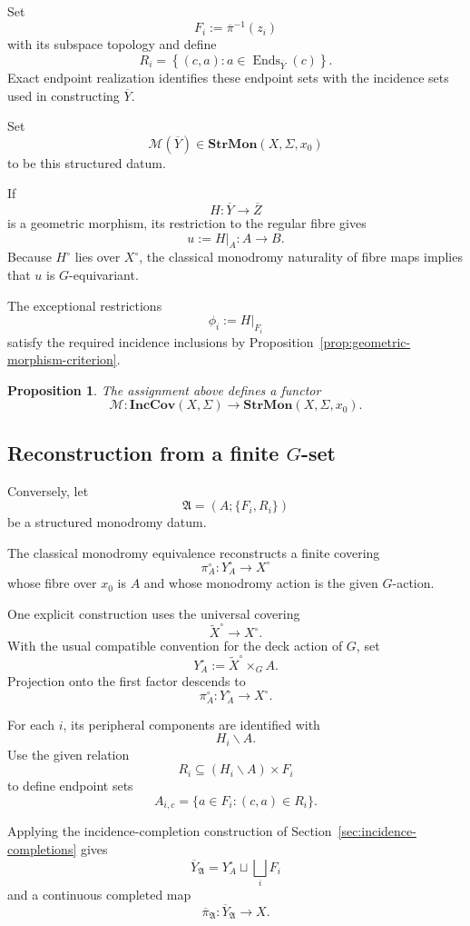 \documentclass[11pt]{article}
\theoremstyle{plain}
\newtheorem{proposition}[theorem]{Proposition}
\theoremstyle{definition}
\begin{document}
Set
\[
F_i:=\overline\pi^{-1}(z_i)
\]
with its subspace topology and define
\[
R_i
=
\left\{
(c,a):
a\in
\operatorname{Ends}_{\overline Y}(c)
\right\}.
\]
Exact endpoint realization identifies these endpoint sets with the
incidence sets used in constructing $\overline Y$.

Set
\[
\mathscr M(\overline Y)
\in
\mathbf{StrMon}(X,\Sigma,x_0)
\]
to be this structured datum.

If
\[
H:\overline Y\to\overline Z
\]
is a geometric morphism, its restriction to the regular fibre gives
\[
u:=H|_A:A\to B.
\]
Because $H^\circ$ lies over $X^\circ$, the classical monodromy
naturality of fibre maps implies that $u$ is $G$-equivariant.

The exceptional restrictions
\[
\phi_i:=H|_{F_i}
\]
satisfy the required incidence inclusions by
Proposition~\ref{prop:geometric-morphism-criterion}.

\begin{proposition}
\label{prop:extraction-functor}
The assignment above defines a functor
\[
\mathscr M:
\mathbf{IncCov}(X,\Sigma)
\longrightarrow
\mathbf{StrMon}(X,\Sigma,x_0).
\]
\end{proposition}

\subsection{Reconstruction from a finite \texorpdfstring{$G$}{G}-set}
\label{subsec:reconstruction-functor}

Conversely, let
\[
\mathfrak A
=
\left(
A;\{F_i,R_i\}
\right)
\]
be a structured monodromy datum.

The classical monodromy equivalence reconstructs a finite covering
\[
\pi_A^\circ:
Y_A^\circ\longrightarrow X^\circ
\]
whose fibre over $x_0$ is $A$ and whose monodromy action is the given
$G$-action.

One explicit construction uses the universal covering
\[
\widetilde X^\circ\longrightarrow X^\circ.
\]
With the usual compatible convention for the deck action of $G$, set
\[
Y_A^\circ
:=
\widetilde X^\circ\times_G A.
\]
Projection onto the first factor descends to
\[
\pi_A^\circ:Y_A^\circ\to X^\circ.
\]

For each $i$, its peripheral components are identified with
\[
H_i\backslash A.
\]
Use the given relation
\[
R_i
\subseteq
(H_i\backslash A)\times F_i
\]
to define endpoint sets
\[
A_{i,c}
=
\{a\in F_i:(c,a)\in R_i\}.
\]

Applying the incidence-completion construction of
Section~\ref{sec:incidence-completions} gives
\[
\overline Y_{\mathfrak A}
=
Y_A^\circ
\sqcup
\bigsqcup_iF_i
\]
and a continuous completed map
\[
\overline\pi_{\mathfrak A}:
\overline Y_{\mathfrak A}\to X.
\]
\end{document}

